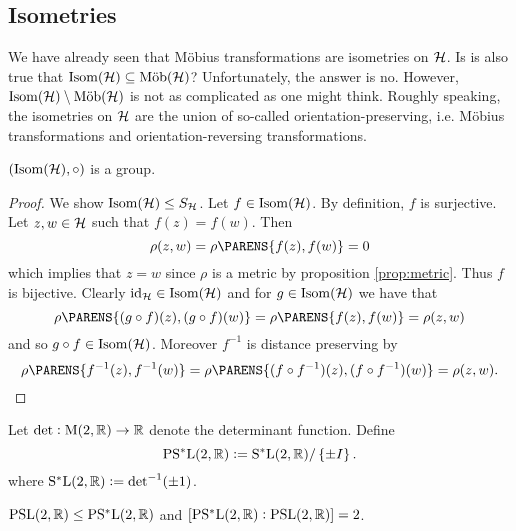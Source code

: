 \subsection{Isometries}
We have already seen that M\"obius transformations are isometries on $\mathcal{H}$. Is is also true that $\mathrm{Isom}(\mathcal{H}) \subseteq \mathrm{M\ddot{o}b}(\mathcal{H})$? Unfortunately, the answer is no. However, $\mathrm{Isom}(\mathcal{H}) \setminus \mathrm{M\ddot{o}b}(\mathcal{H})$ is not as complicated as one might think. Roughly speaking, the isometries on $\mathcal{H}$ are the union of so-called orientation-preserving, i.e. M\"obius transformations and orientation-reversing transformations.

\begin{proposition}
	$(\mathrm{Isom}(\mathcal{H}),\circ)$ is a group.
\end{proposition}

\begin{proof}
	We show $\mathrm{Isom}(\mathcal{H}) \leq S_{\mathcal{H}}$. Let $f \in \mathrm{Isom}(\mathcal{H})$. By definition,	$f$ is surjective. Let $z,w \in \mathcal{H}$ such that $f(z) = f(w)$. Then 
	\begin{equation*}
		\rho(z,w) = \rho\PARENS{f(z),f(w)} = 0
	\end{equation*}
	\noindent which implies that $z = w$ since $\rho$ is a metric by proposition \ref{prop:metric}. Thus $f$ is bijective. Clearly $\operatorname{id}_{\mathcal{H}} \in \mathrm{Isom}(\mathcal{H})$ and for $g \in \mathrm{Isom}(\mathcal{H})$ we have that
	\begin{equation*}
		\rho\PARENS{(g \circ f)(z),(g\circ f)(w)} = \rho\PARENS{f(z),f(w)} = \rho(z,w) 
	\end{equation*}
	\noindent and so $g \circ f \in \mathrm{Isom}(\mathcal{H})$. Moreover $f^{-1}$ is distance preserving by
	\begin{equation*}
		\rho\PARENS{f^{-1}(z),f^{-1}(w)} = \rho\PARENS{(f \circ f^{-1})(z), (f \circ f^{-1})(w)} = \rho(z,w).
	\end{equation*}
\end{proof}

\begin{definition}
	Let $\mathrm{det} : \mathrm{M}(2,\mathbb{R}) \to \mathbb{R}$ denote the determinant function. Define 
	\begin{equation}
		\PSLrmstar(2,\Rbb) := \SLrmstar(2,\Rbb)/\cbr[0]{\pm I}.
	\end{equation}
	\noindent where $\mathrm{S^*L}(2,\mathbb{R}) := \mathrm{det}^{-1}(\pm 1)$.
\end{definition}

\begin{proposition}
	$\mathrm{PSL}(2,\mathbb{R}) \leq \mathrm{PS^*L}(2,\mathbb{R})$ and $\sbr[0]{\PSLrmstar(2,\Rbb) : \PSLrm(2,\Rbb)} = 2$.
	\label{prop:index}
\end{proposition}

